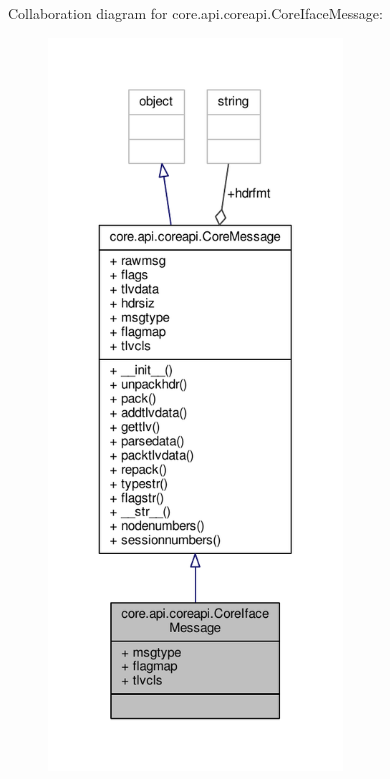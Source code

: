 Collaboration diagram for core.\+api.\+coreapi.\+Core\+Iface\+Message\+:
\nopagebreak
\begin{figure}[H]
\begin{center}
\leavevmode
\includegraphics[height=550pt]{classcore_1_1api_1_1coreapi_1_1_core_iface_message__coll__graph}
\end{center}
\end{figure}
